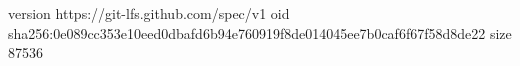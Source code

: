 version https://git-lfs.github.com/spec/v1
oid sha256:0e089cc353e10eed0dbafd6b94e760919f8de014045ee7b0caf6f67f58d8de22
size 87536
